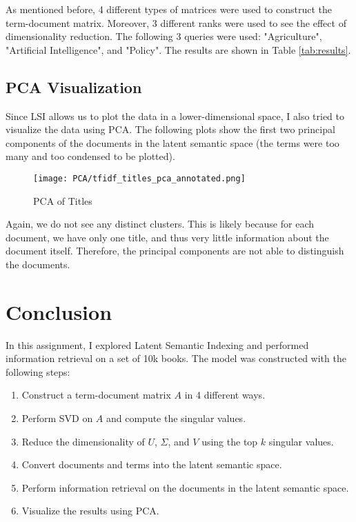 \documentclass[a4paper, 12pt]{article}
\begin{document}
As mentioned before, 4 different types of matrices were used to construct the term-document matrix. Moreover, 3 different ranks were used to see the effect of dimensionality reduction. The following 3 queries were used: "Agriculture", "Artificial Intelligence", and "Policy". The results are shown in Table \ref{tab:results}.




\subsection*{PCA Visualization}

Since LSI allows us to plot the data in a lower-dimensional space, I also tried to visualize the data using PCA. The following plots show the first two principal components of the documents in the latent semantic space (the terms were too many and too condensed to be plotted).

\begin{figure}[htbp]
    \centering
    \texttt{[image: PCA/tfidf\_titles\_pca\_annotated.png]}
    \caption{PCA of Titles}
    \label{fig:pca_titles}
\end{figure}


Again, we do not see any distinct clusters. This is likely because for each document, we have only one title, and thus very little information about the document itself. Therefore, the principal components are not able to distinguish the documents.


\section*{Conclusion}

In this assignment, I explored Latent Semantic Indexing and performed information retrieval on a set of 10k books. The model was constructed with the following steps:

\begin{enumerate}
    \item Construct a term-document matrix $A$ in 4 different ways.
    \item Perform SVD on $A$ and compute the singular values.
    \item Reduce the dimensionality of $U$, $\Sigma$, and $V$ using the top $k$ singular values.
    \item Convert documents and terms into the latent semantic space.
    \item Perform information retrieval on the documents in the latent semantic space.
    \item Visualize the results using PCA.
\end{enumerate}
\end{document}
